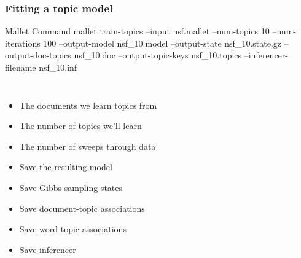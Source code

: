 \begin{frame}
  \frametitle{Fitting a topic model}

\begin{block}{Mallet Command}
\small
  mallet train-topics --input \alert<2>{nsf.mallet}  --num-topics \alert<3>{10} --num-iterations \alert<4>{100} --output-model \alert<5>{nsf\_10.model} --output-state \alert<6>{nsf\_10.state.gz} --output-doc-topics \alert<7>{nsf\_10.doc} --output-topic-keys \alert<8>{nsf\_10.topics} --inferencer-filename \alert<9>{nsf\_10.inf}
\end{block}

\pause

\begin{columns}


  \begin{itemize}
    \item The \alert<2>{documents} we learn topics from 
    \item The \alert<3>{number of topics} we'll learn
    \item The \alert<4>{number of sweeps} through data
    \item Save the \alert<5>{resulting model}
    \item Save \alert<6>{Gibbs sampling states}
    \item Save \alert<7>{document-topic associations}
    \item Save \alert<8>{word-topic associations}
    \item Save \alert<9>{inferencer}
  \end{itemize}


\end{columns}
\end{frame}

